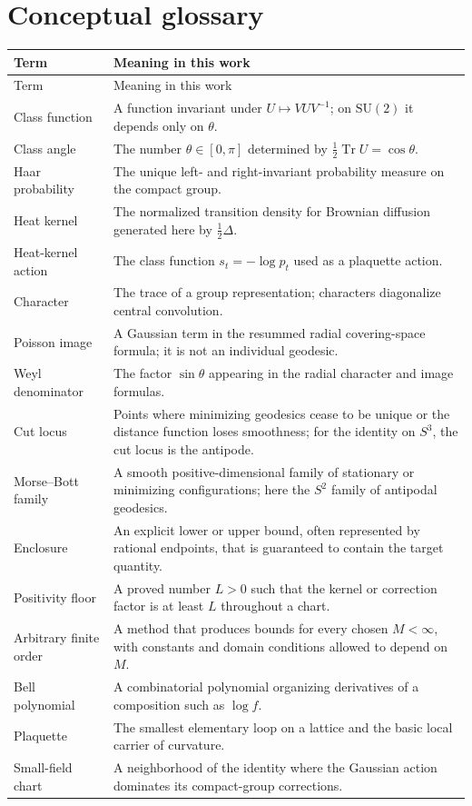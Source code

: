 \documentclass[11pt]{article}
\theoremstyle{definition}
\newcommand{\SU}{\mathrm{SU}(2)}
\newcommand{\Tr}{\operatorname{Tr}}
\begin{document}
\section{Conceptual glossary}

\begin{longtable}{p{}p{}}
\toprule
Term & Meaning in this work \\
\midrule
\endfirsthead
\toprule
Term & Meaning in this work \\
\midrule
\endhead
Class function & A function invariant under $U\mapsto VUV^{-1}$; on $\SU$ it
depends only on $\theta$. \\
Class angle & The number $\theta\in[0,\pi]$ determined by
$\tfrac12\Tr U=\cos\theta$. \\
Haar probability & The unique left- and right-invariant probability measure
on the compact group. \\
Heat kernel & The normalized transition density for Brownian diffusion
generated here by $\tfrac12\Delta$. \\
Heat-kernel action & The class function $s_t=-\log p_t$ used as a plaquette
action. \\
Character & The trace of a group representation; characters diagonalize
central convolution. \\
Poisson image & A Gaussian term in the resummed radial covering-space formula;
it is not an individual geodesic. \\
Weyl denominator & The factor $\sin\theta$ appearing in the radial character
and image formulas. \\
Cut locus & Points where minimizing geodesics cease to be unique or the
distance function loses smoothness; for the identity on $S^3$, the cut locus
is the antipode. \\
Morse--Bott family & A smooth positive-dimensional family of stationary or
minimizing configurations; here the $S^2$ family of antipodal geodesics. \\
Enclosure & An explicit lower or upper bound, often represented by rational
endpoints, that is guaranteed to contain the target quantity. \\
Positivity floor & A proved number $L>0$ such that the kernel or correction
factor is at least $L$ throughout a chart. \\
Arbitrary finite order & A method that produces bounds for every chosen
$M<\infty$, with constants and domain conditions allowed to depend on $M$. \\
Bell polynomial & A combinatorial polynomial organizing derivatives of a
composition such as $\log f$. \\
Plaquette & The smallest elementary loop on a lattice and the basic local
carrier of curvature. \\
Small-field chart & A neighborhood of the identity where the Gaussian action
dominates its compact-group corrections. \\
\bottomrule
\end{longtable}
\end{document}
